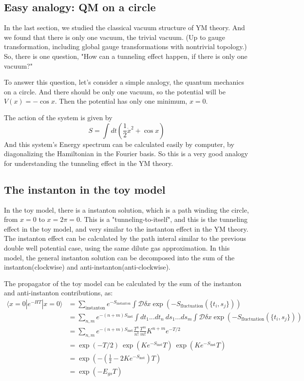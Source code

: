 \documentclass{article}
\begin{document}
\subsection{Easy analogy: QM on a circle}
In the last section, we studied the classical vacuum structure of YM theory.
And we found that there is only one vacuum, the trivial vacuum. (Up to gauge transformation, including global gauge transformations with nontrivial topology.)
So, there is one question, "How can a tunneling effect happen, if there is only one vacuum?"

To answer this question, let's consider a simple analogy, the quantum mechanics on a circle.
And there should be only one vacuum, so the potential will be $V(x)=-\cos x$.
Then the potential has only one minimum, $x=0$.

The action of the system is given by
\[
    S = \int dt \left( \frac{1}{2} \dot{x}^2 + \cos x \right)
\]
And this system's Energy spectrum can be calculated easily by computer, by diagonalizing the Hamiltonian in the Fourier basis.
So this is a very good analogy for understanding the tunneling effect in the YM theory.
\subsection{The instanton in the toy model}
In the toy model, there is a instanton solution, which is a path winding the circle, from $x=0$ to $x=2\pi=0$.
This is a "tunneling-to-itself", and this is the tunneling effect in the toy model, and very similar to the instanton effect in the YM theory.
The instanton effect can be calculated by the path interal similar to the previous double well potential case, using the same dilute gas approximation.
In this model, the general instanton solution can be decomposed into the sum of the instanton(clockwise) and anti-instanton(anti-clockwise).

The propagator of the toy model can be calculated by the sum of the instanton and anti-instanton contributions, as:
\begin{align*}
    \langle x=0 | e^{-HT} | x=0 \rangle &= \sum_{\text{instanton}} e^{-S_{\text{instanton}}} \int \mathcal{D}\delta x \exp(-S_{\text{fluctuation}}(\{t_i,s_j\})) \\
    &= \sum_{n,m} e^{-(n+m)S_{\text{inst}}} \int dt_1 ... dt_n \ ds_1 ... ds_m \int \mathcal{D}\delta x \exp(-S_{\text{fluctuation}}(\{t_i,s_j\})) \\
    &= \sum_{n,m} e^{-(n+m)S_{\text{inst}}} \frac{T^n}{n!} \frac{T^m}{m!} K^{n+m} e^{-T/2} \\
    &= \exp(-T/2) \ \exp(K e^{-S_{\text{inst}}} T) \ \exp(K e^{-S_{\text{inst}}} T) \\
    &= \exp(-(\frac{1}{2}-2K e^{-S_{\text{inst}}})T) \\
    &= \exp(-E_{gs}T)
\end{align*}
\end{document}

